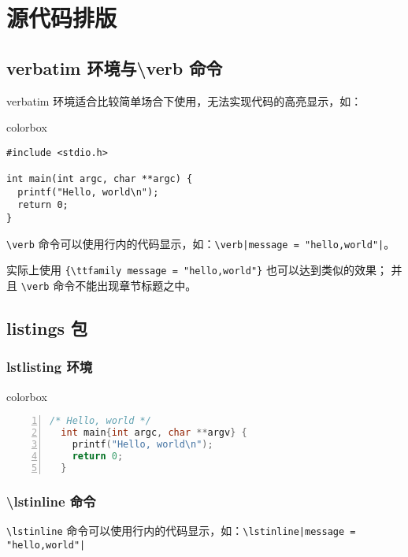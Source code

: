 \chapter{源代码排版}

\section{{\ttfamily verbatim} 环境与{\ttfamily \textbackslash verb} 命令}

{\ttfamily verbatim} 环境适合比较简单场合下使用，无法实现代码的高亮显示，如：

\begin{latexcode}{colorbox}
\begin{verbatim}
#include <stdio.h>

int main(int argc, char **argc) {
  printf("Hello, world\n");
  return 0;
}
\end{verbatim}
\end{latexcode}

\verb|\verb| 命令可以使用行内的代码显示，如：\verb!\verb|message = "hello,world"|!。

实际上使用 \verb|{\ttfamily message = "hello,world"}| 也可以达到类似的效果；
并且 \verb|\verb| 命令不能出现章节标题之中。

\section{listings 包}

\subsection{{\ttfamily lstlisting} 环境}

\begin{latexcode}{colorbox}
\begin{lstlisting}[language=C,caption={C/C++ 语言},numbers=left]
  /* Hello, world */
  int main{int argc, char **argv} {
    printf("Hello, world\n");
    return 0;
  }
\end{lstlisting}
\end{latexcode}

\subsection{{\ttfamily \textbackslash lstinline} 命令}

\verb|\lstinline| 命令可以使用行内的代码显示，如：\verb!\lstinline|message = "hello,world"|!

